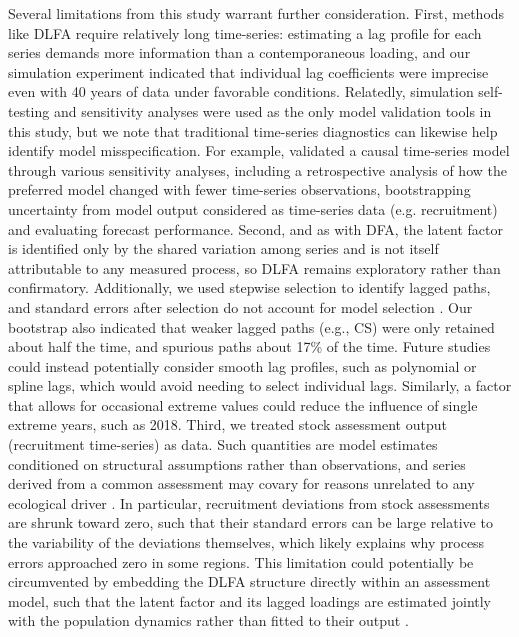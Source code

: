 \documentclass[12pt]{article}
\begin{document}
Several limitations from this study warrant further consideration.
First, methods like DLFA require relatively long time-series:
estimating a lag profile for each series demands more information than a
contemporaneous loading, and our simulation experiment indicated that
individual lag coefficients were imprecise even with 40 years of data
under favorable conditions. Relatedly, simulation self-testing and
sensitivity analyses were used as the only model validation tools in
this study, but we note that traditional time-series diagnostics can
likewise help identify model misspecification. For example,
\citet{ma_leveraging_2026} validated a causal time-series model through
various sensitivity analyses, including a retrospective analysis of how
the preferred model changed with fewer time-series observations,
bootstrapping uncertainty from model output considered as time-series
data (e.g. recruitment) and evaluating forecast performance. Second, and
as with DFA, the latent factor is identified only by the shared
variation among series and is not itself attributable to any measured
process, so DLFA remains exploratory rather than confirmatory.
Additionally, we used stepwise selection to identify lagged paths, and
standard errors after selection do not account for model selection
\citep{berk_valid_2013}. Our bootstrap also indicated that weaker lagged
paths (e.g., CS) were only retained about half the time, and spurious
paths about 17\% of the time. Future studies could instead potentially consider
smooth lag profiles, such as polynomial \citep{almon_distributed_1965}
or spline \citep{gasparrini_distributed_2010} lags, which would avoid
needing to select individual lags. Similarly, a factor that allows for
occasional extreme values \citep{anderson_black-swan_2017} could reduce
the influence of single extreme years, such as 2018. Third, we treated stock assessment
output (recruitment time-series) as data. Such quantities are model
estimates conditioned on structural assumptions rather than
observations, and series derived from a common assessment may covary for
reasons unrelated to any ecological driver \citep{brooks_when_2015}.
In particular, recruitment deviations from stock assessments are shrunk
toward zero, such that their standard errors can be large relative to
the variability of the deviations
themselves, which likely explains why process errors approached zero in
some regions. This limitation could potentially be circumvented by embedding
the DLFA structure directly within an assessment model, such that the
latent factor and its lagged loadings are estimated jointly with the
population dynamics rather than fitted to their output
\citep{champagnat_causal_2026}.
\end{document}
